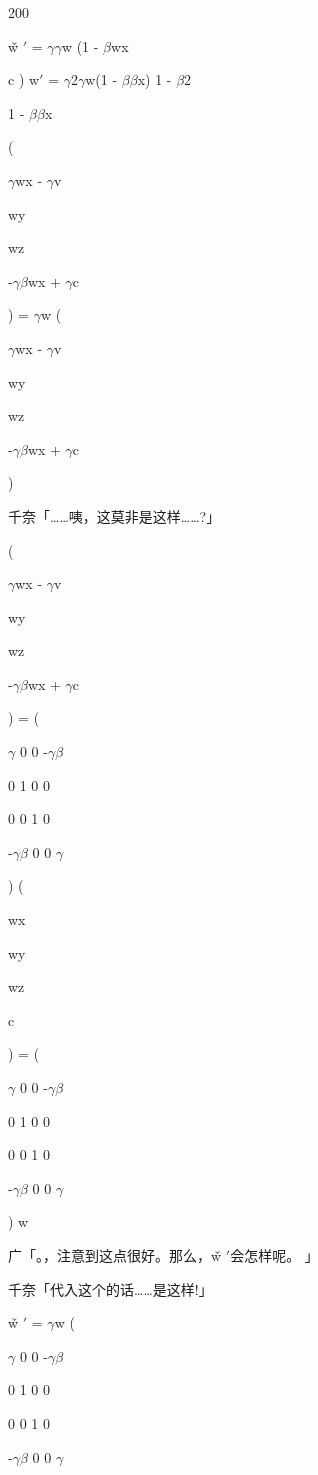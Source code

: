 200\par
w̌ $\prime$ = $\gamma$$\gamma$w (1 - $\beta$wx\par
c ) w$\prime$ = $\gamma$2$\gamma$w(1 - $\beta$$\beta$x) 1 - $\beta$2\par
1 - $\beta$$\beta$x\par
(\par
$\gamma$wx - $\gamma$v\par
wy\par
wz\par
-$\gamma$$\beta$wx + $\gamma$c\par
) = $\gamma$w (\par
$\gamma$wx - $\gamma$v\par
wy\par
wz\par
-$\gamma$$\beta$wx + $\gamma$c\par
)\par
千奈「……咦，这莫非是这样……?」\par
(\par
$\gamma$wx - $\gamma$v\par
wy\par
wz\par
-$\gamma$$\beta$wx + $\gamma$c\par
) = (\par
$\gamma$ 0 0 -$\gamma$$\beta$\par
0 1 0 0\par
0 0 1 0\par
-$\gamma$$\beta$ 0 0 $\gamma$\par
) (\par
wx\par
wy\par
wz\par
c\par
) = (\par
$\gamma$ 0 0 -$\gamma$$\beta$\par
0 1 0 0\par
0 0 1 0\par
-$\gamma$$\beta$ 0 0 $\gamma$\par
) w\par
广「。，注意到这点很好。那么，w̌ $\prime$会怎样呢。 」\par
千奈「代入这个的话……是这样!」\par
w̌ $\prime$ = $\gamma$w (\par
$\gamma$ 0 0 -$\gamma$$\beta$\par
0 1 0 0\par
0 0 1 0\par
-$\gamma$$\beta$ 0 0 $\gamma$\par
